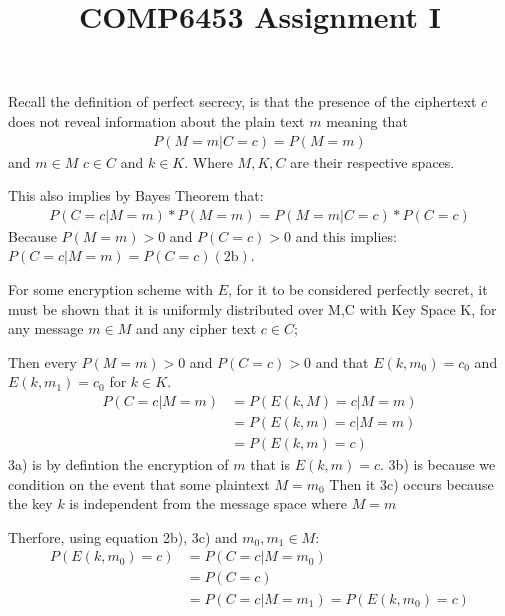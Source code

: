 \documentclass[10pt]{article}
\title{COMP6453 Assignment I}
\begin{document}
\maketitle

Recall the definition of perfect secrecy, is that the presence of the ciphertext $c$
does not reveal information about the plain text $m$ meaning that
\begin{subequations}
    \begin{align}
        P(M = m | C = c) = P(M = m) 
    \end{align}
\end{subequations}
and $m \in M$ $c \in C$ and $k \in K$. Where $M,K,C$ are their respective spaces.

This also implies by Bayes Theorem that:
\begin{subequations}
    \begin{align}
        P(C = c | M = m) * P(M = m) = P(M = m | C = c) * P(C = c)
    \end{align}
\end{subequations}
Because $P(M = m) > 0$ and $P(C = c) > 0$ and this implies:
$P(C = c|M = m) = P(C = c) (2\text{b})$.



For some encryption scheme with $E$, for it
to be considered perfectly secret,
it must be shown that it is uniformly distributed 
over M,C with Key Space K, for any message $m \in M$ and 
any cipher text $c \in C$;

Then every $P(M = m) > 0$ and $P(C = c) > 0$ and that
$E(k, m_0) = c_0$ and $E(k, m_1) = c_0$ for $k \in K$.
\begin{subequations}
    \begin{align}
    P(C = c | M = m) &= P(E(k, M) = c| M = m) 
    \\
    &= P(E(k, m) = c | M = m)
    \\
    &= P(E(k, m) = c) 
    \end{align}
\end{subequations}
3a) is by defintion the encryption of $m$ that is $E(k, m) = c$.
3b) is because we condition on the event that some plaintext $M = m_0$ 
Then it 3c) occurs because the key $k$ is independent from the message space where 
$M = m$

Therfore, using equation 2b), 3c) and $m_0, m_1 \in M$:
\begin{subequations}
    \begin{align}
        P(E(k, m_0) = c) &= P(C = c | M = m_0)
        \\
        &= P(C = c)
        \\
        &= P(C = c | M = m_1) = P(E(k, m_0) = c)
    \end{align}
\end{subequations}
\end{document}
